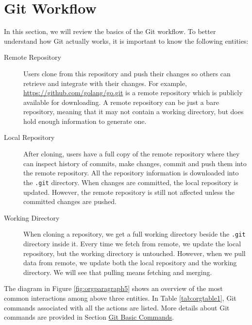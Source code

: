 \documentclass[11pt]{article}
\begin{document}
\section{Git Workflow}
\label{sec:orgheadline7}
In this section, we will review the basics of the Git workflow. To better understand how Git actually works, it is important to know the following entities:
\begin{description}
\item[{Remote Repository}] Users clone from this repository and push their changes so others can retrieve and integrate with their changes. For example, \href{https://github.com/golang/go.git}{\url{https://github.com/golang/go.git}} is a remote repository which is publicly available for downloading. A remote repository can be just a bare repository, meaning that it may not contain a working directory, but does hold enough information to generate one.
\item[{Local Repository}] After cloning, users have a full copy of the remote repository where they can inspect history of commits, make changes, commit and push them into the remote repository. All the repository information is downloaded into the \texttt{.git} directory. When changes are committed, the local repository is updated. However, the remote repository is still not affected unless the committed changes are pushed.
\item[{Working Directory}] When cloning a repository, we get a full working directory beside the \texttt{.git} directory inside it. Every time we fetch from remote, we update the local repository, but the working directory is untouched. However, when we pull data from remote, we update both the local repository and the working directory. We will see that pulling means fetching and merging.
\end{description}
The diagram in Figure \ref{fig:orgparagraph5} shows an overview of the most common interactions among above three entities. In Table \ref{tab:orgtable1}, Git commands associated with all the actions are listed. More details about Git commands are provided in Section \hyperref[orgtarget4]{Git Basic Commands}.
\end{document}
